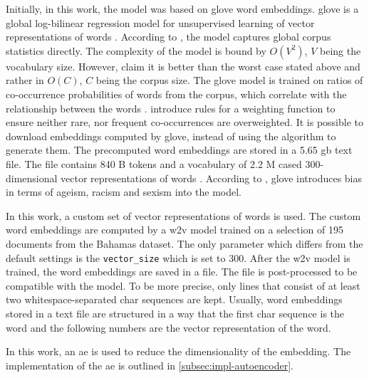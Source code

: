 Initially, in this work, the \infersent{} model was based on \acs{glove} word embeddings.
\acs{glove} is a global log-bilinear regression model for unsupervised learning of vector representations of words \cite{glove2014}. 
According to \citeauthor{glove2014}, the model captures global corpus statistics directly.
The complexity of the model is bound by $O(V^2)$, $V$ being the vocabulary size.
However, \citeauthor{glove2014} claim it is better than the worst case stated above and rather in $O(C)$, $C$ being the corpus size.
The \acs{glove} model is trained on ratios of co-occurrence probabilities of words from the corpus, 
which correlate with the relationship between the words \cite{glove2014}.
\citeauthor{glove2014} introduce rules for a weighting function to ensure neither rare, nor frequent co-occurrences are overweighted.
It is possible to download embeddings computed by \acs{glove}, instead of using the algorithm to generate them.
The precomputed word embeddings are stored in a 5.65 \ac{gb} text file.
The file contains 840 B tokens and a vocabulary of 2.2 M cased 300-dimensional vector representations of words \cite{download-glove}.
According to \citeauthor{UniversalSentEnc2018}, \acs{glove} introduces bias in terms of ageism, racism and sexism into the model.

In this work, a custom set of vector representations of words is used.
The custom word embeddings are computed by a \ac{w2v} model trained on a selection of 195 documents from the Bahamas dataset.
The only parameter which differs from the default settings is the \texttt{vector\_size} which is set to 300.
After the \ac{w2v} model is trained, the word embeddings are saved in a file.
The file is post-processed to be compatible with the \infersent{} model.
To be more precise, only lines that consist of at least two whitespace-separated char sequences are kept.
Usually, word embeddings stored in a text file are structured in a way that 
the first char sequence is the word and the following numbers are the vector representation of the word.

In this work, an \ac{ae} is used to reduce the dimensionality of the \infersent{} embedding.
The implementation of the \ac{ae} is outlined in \autoref{subsec:impl-autoencoder}.
